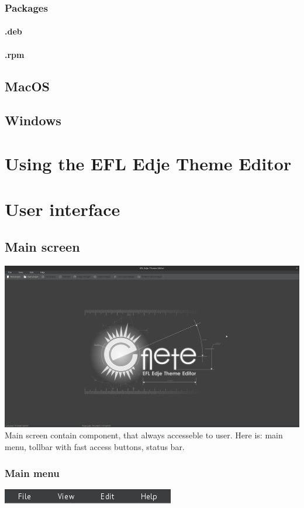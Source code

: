 \documentclass[titlepage,oneside,11pt]{book}
\begin{document}
\subsection{Packages}
\subsubsection{.deb}
\subsubsection{.rpm}
\newpage
\section{MacOS}
\newpage
\section{Windows}
\chapter{Using the EFL Edje Theme Editor}
\chapter{User interface}
\section{Main screen}
\includegraphics[scale=0.2]{images/main_screen.png}
Main screen contain component, that always accesseble to user. Here is: main menu, tollbar with fast access buttons, status bar.
\subsection{Main menu}
\includegraphics{images/main_menu.png}
\end{document}
